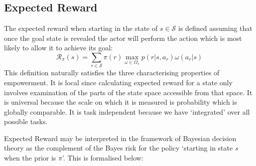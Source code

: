 \documentclass{article}
\newcommand{\Ss}{\mathcal{S}}
\newcommand{\Rr}{\mathcal{R}}
\begin{document}
\subsection{Expected Reward}
The expected reward when starting in the state of $s\in\mathcal{S}$ is defined assuming that once the goal state is revealed the actor will perform the action which is most likely to allow it to achieve its goal:
\[\Rr_\pi(s) = \sum_{r\in\Ss} \pi(r) \max_{\omega\in\Omega_s} p(r|s,a_r)\omega(a_r|s)\]
This definition naturally satisfies the three characterising properties of empowerment. It is local since calculating expected reward for a state only involves examination of the parts of the state space accessible from that space. It is universal because the scale on which it is measured is probability which is globally comparable. It is task independent because we have `integrated' over all possible tasks.

Expected Reward may be interpreted in the framework of Bayesian decision theory as the complement of the Bayes risk for the policy `starting in state $s$ when the prior is $\pi$'. This is formalised below: 
\end{document}
